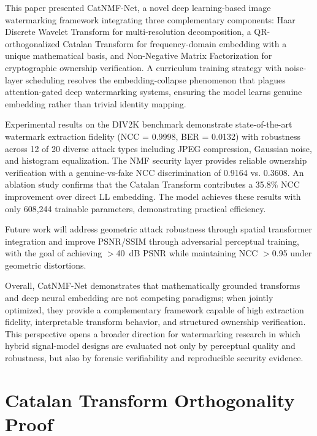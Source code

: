 \documentclass[journal]{IEEEtran}
\begin{document}
This paper presented CatNMF-Net, a novel deep learning-based image
watermarking framework integrating three complementary components:
Haar Discrete Wavelet Transform for multi-resolution decomposition,
a QR-orthogonalized Catalan Transform for frequency-domain embedding
with a unique mathematical basis, and Non-Negative Matrix Factorization
for cryptographic ownership verification. A curriculum training strategy
with noise-layer scheduling resolves the embedding-collapse phenomenon
that plagues attention-gated deep watermarking systems, ensuring the
model learns genuine embedding rather than trivial identity mapping.

Experimental results on the DIV2K benchmark demonstrate state-of-the-art
watermark extraction fidelity (NCC = 0.9998, BER = 0.0132) with
robustness across 12 of 20 diverse attack types including JPEG
compression, Gaussian noise, and histogram equalization. The NMF security
layer provides reliable ownership verification with a genuine-vs-fake NCC
discrimination of 0.9164 vs. 0.3608. An ablation study confirms that the
Catalan Transform contributes a 35.8\% NCC improvement over direct LL
embedding. The model achieves these results with only 608,244 trainable
parameters, demonstrating practical efficiency.

Future work will address geometric attack robustness through spatial
transformer integration and improve PSNR/SSIM through adversarial
perceptual training, with the goal of achieving $>$40~dB PSNR while
maintaining NCC $>$0.95 under geometric distortions.

Overall, CatNMF-Net demonstrates that mathematically grounded transforms and
deep neural embedding are not competing paradigms; when jointly optimized,
they provide a complementary framework capable of high extraction fidelity,
interpretable transform behavior, and structured ownership verification.
This perspective opens a broader direction for watermarking research in which
hybrid signal-model designs are evaluated not only by perceptual quality and
robustness, but also by forensic verifiability and reproducible security
evidence.

\appendices

\section{Catalan Transform Orthogonality Proof}
\label{app:catalan_proof}
\end{document}

